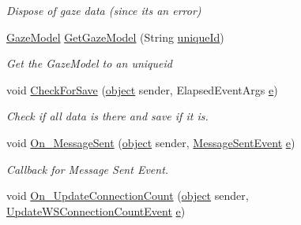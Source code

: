 \begin{DoxyCompactItemize}
\begin{DoxyCompactList}\small\item\em Dispose of gaze data (since its an error) \end{DoxyCompactList}\item 
\hyperlink{class_web_analyzer_1_1_models_1_1_data_model_1_1_gaze_model}{Gaze\+Model} \hyperlink{class_web_analyzer_1_1_controller_1_1_test_controller_ad375d558e5d63a79680f3fe53f1326b4}{Get\+Gaze\+Model} (String \hyperlink{_u_i_2_h_t_m_l_resources_2js_2lib_2underscore_8min_8js_af690ff5521d79c7128861033ae80ae17}{unique\+Id})
\begin{DoxyCompactList}\small\item\em Get the Gaze\+Model to an uniqueid \end{DoxyCompactList}\item 
void \hyperlink{class_web_analyzer_1_1_controller_1_1_test_controller_a19c13e671b0a950a1b012424fd7c2560}{Check\+For\+Save} (\hyperlink{_u_i_2_h_t_m_l_resources_2js_2lib_2underscore_8min_8js_aae18b7515bb2bc4137586506e7c0c903}{object} sender, Elapsed\+Event\+Args \hyperlink{_u_i_2_h_t_m_l_resources_2js_2lib_2bootstrap_8min_8js_ab5902775854a8b8440bcd25e0fe1c120}{e})
\begin{DoxyCompactList}\small\item\em Check if all data is there and save if it is. \end{DoxyCompactList}\item 
void \hyperlink{class_web_analyzer_1_1_controller_1_1_test_controller_ab70718909a47aded762d0021e5ccb7b2}{On\+\_\+\+Message\+Sent} (\hyperlink{_u_i_2_h_t_m_l_resources_2js_2lib_2underscore_8min_8js_aae18b7515bb2bc4137586506e7c0c903}{object} sender, \hyperlink{class_web_analyzer_1_1_events_1_1_message_sent_event}{Message\+Sent\+Event} \hyperlink{_u_i_2_h_t_m_l_resources_2js_2lib_2bootstrap_8min_8js_ab5902775854a8b8440bcd25e0fe1c120}{e})
\begin{DoxyCompactList}\small\item\em Callback for Message Sent Event. \end{DoxyCompactList}\item 
void \hyperlink{class_web_analyzer_1_1_controller_1_1_test_controller_aab50b4935b131507a7dbfae94aa632df}{On\+\_\+\+Update\+Connection\+Count} (\hyperlink{_u_i_2_h_t_m_l_resources_2js_2lib_2underscore_8min_8js_aae18b7515bb2bc4137586506e7c0c903}{object} sender, \hyperlink{class_web_analyzer_1_1_events_1_1_update_w_s_connection_count_event}{Update\+W\+S\+Connection\+Count\+Event} \hyperlink{_u_i_2_h_t_m_l_resources_2js_2lib_2bootstrap_8min_8js_ab5902775854a8b8440bcd25e0fe1c120}{e})

\end{DoxyCompactItemize}
